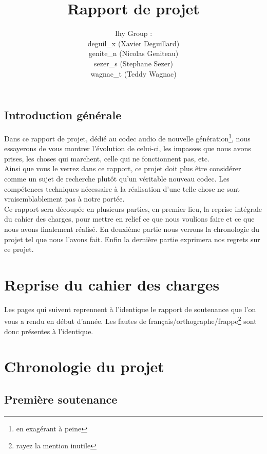 \documentclass[a4paper,12pt]{report}
\title{Rapport de projet}
\author{
Ihy Group : \\
deguil\_x (Xavier Deguillard)\\
genite\_n (Nicolas Geniteau)\\
sezer\_s (Stephane Sezer)\\
wagnac\_t (Teddy Wagnac)
}
\begin{document}
\maketitle

\section*{Introduction générale}
Dans ce rapport de projet, dédié au codec audio de nouvelle
génération\footnote{en exagérant à peine}, nous essayerons de vous montrer
l'évolution de celui-ci, les impasses que nous avons prises, les choses qui
marchent, celle qui ne fonctionnent pas, etc.\\
Ainsi que vous le verrez dans ce rapport, ce projet doit plus être considérer
comme un sujet de recherche plutôt qu'un véritable nouveau codec. Les
compétences techniques nécessaire à la réalisation d'une telle chose ne sont
vraisemblablement pas à notre portée.\\
Ce rapport sera découpée en plusieurs parties, en premier lieu, la reprise
intégrale du cahier des charges, pour mettre en relief ce que nous voulions
faire et ce que nous avons finalement réalisé. En deuxième partie nous verrons
la chronologie du projet tel que nous l'avons fait. Enfin la dernière partie
exprimera nos regrets sur ce projet.

\tableofcontents

\chapter{Reprise du cahier des charges}
Les pages qui suivent reprennent à l'identique le rapport de soutenance que l'on
vous a rendu en début d'année. Les fautes de
français/orthographe/frappe\footnote{rayez la mention inutile} sont
donc présentes à l'identique.


\chapter{Chronologie du projet}
\section{Première soutenance}
\end{document}
